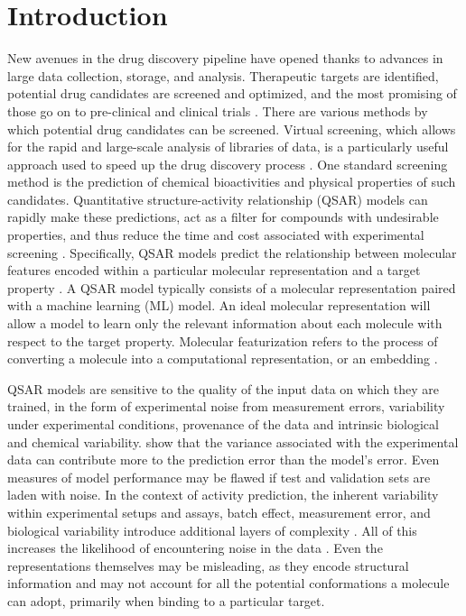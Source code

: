 \documentclass[pdflatex,sn-mathphys-num]{sn-jnl}%
\theoremstyle{thmstyleone}%
\theoremstyle{thmstyletwo}%
\theoremstyle{thmstylethree}%
\begin{document}
\clearpage

\section{Introduction}\label{sec1}

New avenues in the drug discovery pipeline have opened thanks to advances in large data collection, storage, and analysis. Therapeutic targets are identified, potential drug candidates are screened and optimized, and the most promising of those go on to pre-clinical and clinical trials \citep{Lill2007}. There are various methods by which potential drug candidates can be screened. Virtual screening, which allows for the rapid and large-scale analysis of libraries of data, is a particularly useful approach used to speed up the drug discovery process \citep{Neves2018}. One standard screening method is the prediction of chemical bioactivities and physical properties of such candidates. Quantitative structure-activity relationship (QSAR) models can rapidly make these predictions, act as a filter for compounds with undesirable properties, and thus reduce the time and cost associated with experimental screening \citep{Sabando2021}. Specifically, QSAR models predict the relationship between molecular features encoded within a particular molecular representation and a target property \citep{Sabando2021}. A QSAR model typically consists of a molecular representation paired with a machine learning (ML) model. An ideal molecular representation will allow a model to learn only the relevant information about each molecule with respect to the target property. Molecular featurization refers to the process of converting a molecule into a computational representation, or an embedding \citep{Sabando2021}. 

QSAR models are sensitive to the quality of the input data on which they are trained, in the form of experimental noise from measurement errors, variability under experimental conditions, provenance of the data and intrinsic biological and chemical variability. \cite{Kolmar2021} show that the variance associated with the experimental data can contribute more to the prediction error than the model's error. Even measures of model performance may be flawed if test and validation sets are laden with noise. In the context of activity prediction, the inherent variability within experimental setups and assays, batch effect, measurement error, and biological variability introduce additional layers of complexity \citep{Kolmar2021, Fourches2010}. All of this increases the likelihood of encountering noise in the data \citep{Fang2022}. Even the representations themselves may be misleading, as they encode structural information and may not account for all the potential conformations a molecule can adopt, primarily when binding to a particular target. 
\end{document}
